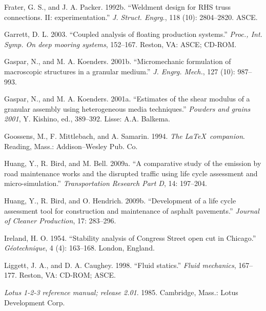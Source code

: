 \documentclass[
  NewProceedings,
  letterpaper]{./assets/ascelike-new}
\newlength{\cslhangindent}
\newlength{\cslentryspacingunit} %
\newenvironment{CSLReferences}[2] %
 {%
  \setlength{\parindent}{0pt}
  \ifodd #1
  \let\oldpar\par
  \def\par{\hangindent=\cslhangindent\oldpar}
  \fi
  \setlength{\parskip}{#2\cslentryspacingunit}
 }%
 {}
\begin{document}
\begin{CSLReferences}{1}{0}
\leavevmode{}%
Frater, G. S., and J. A. Packer. 1992b. {``Weldment design for {RHS}
truss connections. {II}: experimentation.''} \emph{J. Struct. Engrg.},
118 (10): 2804--2820. ASCE.

\leavevmode{}%
Garrett, D. L. 2003. {``Coupled analysis of floating production
systems.''} \emph{Proc., Int. Symp. On deep mooring systems}, 152--167.
Reston, VA: ASCE; CD-ROM.

\leavevmode{}%
Gaspar, N., and M. A. Koenders. 2001b. {``Micromechanic formulation of
macroscopic structures in a granular medium.''} \emph{J. Engrg. Mech.},
127 (10): 987--993.

\leavevmode{}%
Gaspar, N., and M. A. Koenders. 2001a. {``Estimates of the shear modulus
of a granular assembly using heterogeneous media techniques.''}
\emph{Powders and grains 2001}, Y. Kishino, ed., 389--392. Lisse: A.A.
Balkema.

\leavevmode{}%
Goossens, M., F. Mittlebach, and A. Samarin. 1994. \emph{The
LaTeX~companion}. Reading, Mass.: Addison--Wesley Pub. Co.

\leavevmode{}%
Huang, Y., R. Bird, and M. Bell. 2009a. {``A comparative study of the
emission by road maintenance works and the disrupted traffic using life
cycle assessment and micro-simulation.''} \emph{Transportation Research
Part D}, 14: 197--204.

\leavevmode{}%
Huang, Y., R. Bird, and O. Hendrich. 2009b. {``Development of a life
cycle assessment tool for construction and maintenance of asphalt
pavements.''} \emph{Journal of Cleaner Production}, 17: 283--296.

\leavevmode{}%
Ireland, H. O. 1954. {``Stability analysis of {C}ongress {S}treet open
cut in {C}hicago.''} \emph{G{é}otechnique}, 4 (4): 163--168. London,
England.

\leavevmode{}%
Liggett, J. A., and D. A. Caughey. 1998. {``Fluid statics.''}
\emph{Fluid mechanics}, 167--177. Reston, VA: CD-ROM; ASCE.

\leavevmode{}%
\emph{Lotus 1-2-3 reference manual; release 2.01}. 1985. Cambridge,
Mass.: Lotus Development Corp.


\end{CSLReferences}
\end{document}
